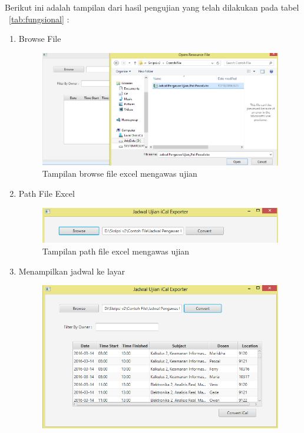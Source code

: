 Berikut ini adalah tampilan dari hasil pengujian yang telah dilakukan pada tabel ~\ref{tab:fungsional} :
\begin{enumerate}
	\item Browse File
		\begin{figure}[H]
		\centering
		\includegraphics[scale=0.7]{Gambar/browseFile}
		\caption{Tampilan browse file excel mengawas ujian}
		\label{fig:browseFile}
		\end{figure}
	\item Path File Excel
		\begin{figure}[H]
		\centering
		\includegraphics[scale=0.7]{Gambar/pathFile}
		\caption{Tampilan path file excel mengawas ujian}
		\label{fig:pathFile}
		\end{figure}
	\item Menampilkan jadwal ke layar
		\begin{figure}[H]
		\centering
		\includegraphics[scale=0.7]{Gambar/implementAntarmuka2}

\end{figure}
\end{enumerate}
